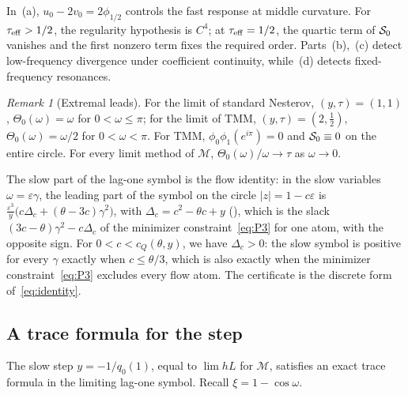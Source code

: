 \documentclass[11pt]{article}
\theoremstyle{definition}
\theoremstyle{remark}
\newtheorem{remark}[theorem]{Remark}
\newcommand{\cM}{\mathcal M}
\newcommand{\cQ}{c_{Q}}
\newcommand{\teff}{\tau_{\rm eff}}
\begin{document}
In~(a), \(u_0-2v_0=2\phi_{1/2}\) controls the fast response at middle curvature.
For \(\teff>1/2\), the regularity hypothesis is \(C^4\); at \(\teff=1/2\),
the quartic term of \(\mathcal S_0\) vanishes and the first nonzero term fixes the
required order.  Parts~(b),~(c) detect low-frequency divergence under
coefficient continuity, while~(d) detects fixed-frequency resonances.

\begin{remark}[Extremal leads]\label{rem:halfstep}
For the limit of standard Nesterov, \((y,\tau)=(1,1)\),
\(\Theta_0(\omega)=\omega\) for \(0<\omega\le\pi\); for the limit of TMM, \((y,\tau)=(2,\tfrac12)\),
\(\Theta_0(\omega)=\omega/2\) for \(0<\omega<\pi\).
For TMM, \(\phi_0\phi_1(e^{i\pi})=0\) and \(\mathcal S_0\equiv0\) on the entire circle.
For every limit method of \(\cM\), \(\Theta_0(\omega)/\omega\to\tau\) as \(\omega\to0\).

The slow part of the lag-one symbol is the flow identity: in the slow variables \(\omega=\varepsilon\gamma\), the leading part
of the symbol on the circle \(|z|=1-c\varepsilon\) is \(\frac{\varepsilon^3}y\bigl(c\Delta_c+(\theta-3c)\gamma^2\bigr)\), with \(\Delta_c=c^2-\theta c+y\)
(), which is
the slack \((3c-\theta)\gamma^2-c\Delta_c\) of the minimizer constraint~\eqref{eq:P3} for one atom, with the opposite sign.
For \(0<c<\cQ(\theta,y)\), we have \(\Delta_c>0\): the slow symbol is positive
for every \(\gamma\) exactly when \(c\le\theta/3\), which is also exactly when
the minimizer constraint~\eqref{eq:P3} excludes every flow atom.
The certificate is the discrete form of~\eqref{eq:identity}.
\end{remark}


\subsection{A trace formula for the step}
\label{sec:trace}

The slow step \(y=-1/q_0(1)\), equal to \(\lim hL\) for \(\cM\), satisfies
an exact trace formula in the limiting lag-one symbol.  Recall
\(\xi=1-\cos\omega\).
\end{document}
